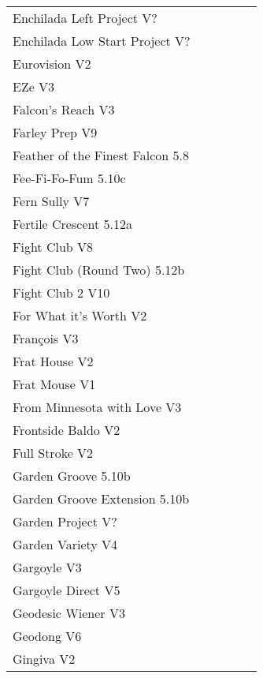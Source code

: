 \begin{flushleft}
\begin{center}
\begin{supertabular}{p{0.76\linewidth}p{0.08\linewidth}}
Enchilada Left Project V? & \pageref{vr:Enchilada Left Project} \\
Enchilada Low Start Project V? & \pageref{vr:Enchilada Low Start Project} \\
Eurovision V2 & \pageref{rt:Eurovision} \\
EZe V3 & \pageref{vr:EZe} \\
Falcon's Reach V3 & \pageref{rt:Falcon's Reach} \\
Farley Prep V9 & \pageref{rt:Farley Prep} \\
Feather of the Finest Falcon 5.8 & \pageref{rt:Feather of the Finest Falcon} \\
Fee-Fi-Fo-Fum 5.10c & \pageref{rt:Fee-Fi-Fo-Fum} \\
Fern Sully V7 & \pageref{rt:Fern Sully} \\
Fertile Crescent 5.12a & \pageref{rt:Fertile Crescent} \\
Fight Club V8 & \pageref{rt:Fight Club} \\
Fight Club (Round Two) 5.12b & \pageref{rt:Fight Club (Round Two)} \\
Fight Club 2 V10 & \pageref{rt:Fight Club 2} \\
For What it's Worth V2 & \pageref{rt:For What it's Worth} \\
François V3 & \pageref{rt:François} \\
Frat House V2 & \pageref{rt:Frat House} \\
Frat Mouse V1 & \pageref{rt:Frat Mouse} \\
From Minnesota with Love V3 & \pageref{rt:From Minnesota with Love} \\
Frontside Baldo V2 & \pageref{rt:Frontside Baldo} \\
Full Stroke V2 & \pageref{rt:Full Stroke} \\
Garden Groove 5.10b & \pageref{rt:Garden Groove} \\
Garden Groove Extension 5.10b & \pageref{vr:Garden Groove Extension} \\
Garden Project V? & \pageref{rt:Garden Project} \\
Garden Variety V4 & \pageref{rt:Garden Variety} \\
Gargoyle V3 & \pageref{rt:Gargoyle} \\
Gargoyle Direct V5 & \pageref{vr:Gargoyle Direct} \\
Geodesic Wiener V3 & \pageref{rt:Geodesic Wiener} \\
Geodong V6 & \pageref{vr:Geodong} \\
Gingiva V2 & \pageref{rt:Gingiva} \\

\end{supertabular}
\end{center}
\end{flushleft}
